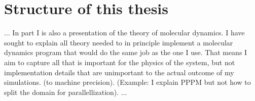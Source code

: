 \section{Structure of this thesis}
...
In part I is also a presentation of the theory of molecular dynamics. I have sought to explain all theory needed to in principle implement a molecular dynamics program that would do the same job as the one I use. That means I aim to capture all that is important for the physics of the system, but not implementation details that are unimportant to the actual outcome of my simulations. (to machine precision). (Example: I explain PPPM but not how to split the domain for parallellization).
...
